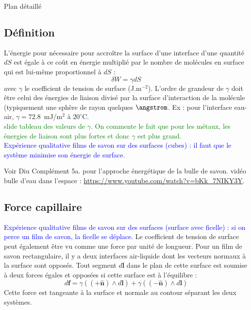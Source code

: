 \begin{reportBlock}{Plan détaillé}
  \subsection{Définition}
  L'énergie pour nécessaire pour accroître la surface d'une interface d'une quantité $dS$ est égale à ce coût en énergie multiplié par le nombre de molécules en surface qui est lui-même proportionnel à $dS$ :
  \begin{equation}
      \delta W = \gamma dS
  \end{equation}
  avec $\gamma$ le coefficient de tension de surface (J.m$^{-2}$). L'ordre de grandeur de $\gamma$ doit être celui des énergies de liaison divisé par la surface d'interaction de la molécule (typiquement une sphère de rayon quelques $\angstrom$. Ex : pour l'interface eau-air, $\gamma = 72.8$~mJ/m$^2$ à $20^{\circ}$C. \\
  
  \textcolor{green}{slide tableau des valeurs de $\gamma$. On commente le fait que pour les métaux, les énergies de liaison sont plus fortes et donc $\gamma$ est plus grand.}\\

  \textcolor{blue}{Expérience qualitative films de savon sur des surfaces (cubes) : il faut que le système minimise son énergie de surface.}

   Voir Diu Complément 5a. pour l'approche énergétique de la bulle de savon. vidéo bulle d'eau dans l'espace : \url{https://www.youtube.com/watch?v=bKk_7NIKY3Y}. 
   
  \subsection{Force capillaire}

  \textcolor{blue}{Expérience qualitative films de savon sur des surfaces (surface avec ficelle) : si on perce un film de savon, la ficelle se déplace.}
  Le coefficient de tension de surface peut également être vu comme une force par unité de longueur. Pour un film de savon rectangulaire, il y a deux interfaces air-liquide dont les vecteurs normaux à la surface sont opposés. Tout segment $d\mathbf{l}$ dans le plan de cette surface est soumise à deux forces égales et opposées si cette surface est à l'équilibre  :
  \begin{equation}
      d\mathbf{f} = \gamma((\mathbf{+\hat{n}})\wedge d\mathbf{l}) +\gamma((\mathbf{-\hat{n}})\wedge d\mathbf{l})
  \end{equation}
  Cette force est tangeante à la surface et normale au contour séparant les deux systèmes.\\
  

\end{reportBlock}

